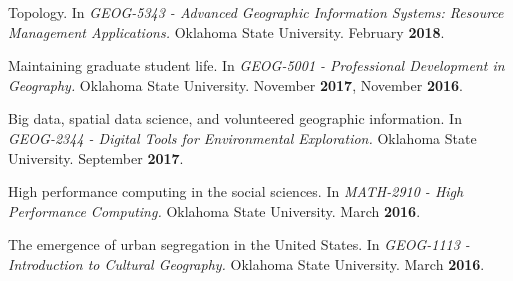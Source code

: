 \begin{cventries}

  \cventry
    {}
    {}
    {}
    {}
    {
       \begin{cvitems}
          \vspace{-3mm}
        \item {Topology. In \textit{GEOG-5343 - Advanced Geographic Information
              Systems: Resource Management Applications.} Oklahoma State
            University. February \textbf{2018}.}
          \end{cvitems}
        } %

  \cventry
    {}
    {}
    {}
    {}
    {
       \begin{cvitems}
          \vspace{-3mm}
        \item {Maintaining graduate student life. In \textit{GEOG-5001 -
              Professional Development in Geography.} Oklahoma State University.
            November \textbf{2017}, November \textbf{2016}.}
          \end{cvitems}
        } %

  \cventry
    {}
    {}
    {}
    {}
    {
      \begin{cvitems}
        \vspace{-3mm}
      \item {Big data, spatial data science, and volunteered geographic
          information. In \textit{GEOG-2344 - Digital Tools for Environmental
            Exploration.} Oklahoma State University. September \textbf{2017}}.
        \end{cvitems}
    }

  \cventry
    {}
    {}
    {}
    {}
    {
       \begin{cvitems}
         \vspace{-3mm}
       \item {High performance computing in the social sciences. In
           \textit{MATH-2910 - High Performance Computing.} Oklahoma State
           University. March \textbf{2016}.}
          \end{cvitems}
        } %
          
  \cventry
    {}
    {}
    {}
    {}
    {
       \begin{cvitems}
          \vspace{-3mm}
        \item {The emergence of urban segregation in the United States. In
            \textit{GEOG-1113 - Introduction to Cultural Geography.} Oklahoma
            State University. March \textbf{2016}.}
          \end{cvitems}
        } %


\end{cventries}
